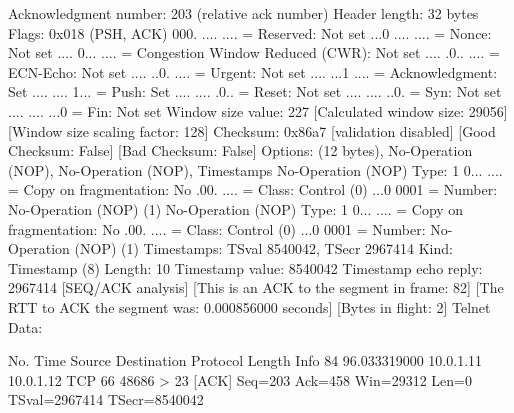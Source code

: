     Acknowledgment number: 203    (relative ack number)
    Header length: 32 bytes
    Flags: 0x018 (PSH, ACK)
        000. .... .... = Reserved: Not set
        ...0 .... .... = Nonce: Not set
        .... 0... .... = Congestion Window Reduced (CWR): Not set
        .... .0.. .... = ECN-Echo: Not set
        .... ..0. .... = Urgent: Not set
        .... ...1 .... = Acknowledgment: Set
        .... .... 1... = Push: Set
        .... .... .0.. = Reset: Not set
        .... .... ..0. = Syn: Not set
        .... .... ...0 = Fin: Not set
    Window size value: 227
    [Calculated window size: 29056]
    [Window size scaling factor: 128]
    Checksum: 0x86a7 [validation disabled]
        [Good Checksum: False]
        [Bad Checksum: False]
    Options: (12 bytes), No-Operation (NOP), No-Operation (NOP), Timestamps
        No-Operation (NOP)
            Type: 1
                0... .... = Copy on fragmentation: No
                .00. .... = Class: Control (0)
                ...0 0001 = Number: No-Operation (NOP) (1)
        No-Operation (NOP)
            Type: 1
                0... .... = Copy on fragmentation: No
                .00. .... = Class: Control (0)
                ...0 0001 = Number: No-Operation (NOP) (1)
        Timestamps: TSval 8540042, TSecr 2967414
            Kind: Timestamp (8)
            Length: 10
            Timestamp value: 8540042
            Timestamp echo reply: 2967414
    [SEQ/ACK analysis]
        [This is an ACK to the segment in frame: 82]
        [The RTT to ACK the segment was: 0.000856000 seconds]
        [Bytes in flight: 2]
Telnet
    Data: 

No.     Time           Source                Destination           Protocol Length Info
     84 96.033319000   10.0.1.11             10.0.1.12             TCP      66     48686 > 23 [ACK] Seq=203 Ack=458 Win=29312 Len=0 TSval=2967414 TSecr=8540042

